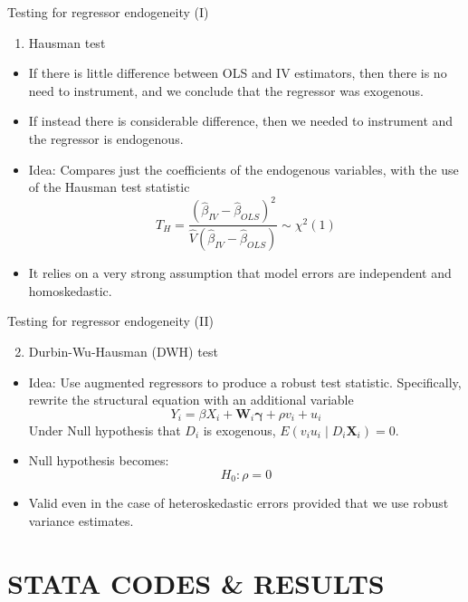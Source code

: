 \documentclass[
  10pt,
  ignorenonframetext,
]{beamer}
\providecommand{\tightlist}{%
  \setlength{\itemsep}{0pt}\setlength{\parskip}{0pt}}
\begin{document}
\begin{frame}{Testing for regressor endogeneity (I)}
\protect\hypertarget{testing-for-regressor-endogeneity-i}{}
\begin{enumerate}
\tightlist
\item
  Hausman test
\end{enumerate}

\begin{itemize}
\item
  If there is little difference between OLS and IV estimators, then
  there is no need to instrument, and we conclude that the regressor was
  exogenous.
\item
  If instead there is considerable difference, then we needed to
  instrument and the regressor is endogenous.
\item
  Idea: Compares just the coefficients of the endogenous variables, with
  the use of the Hausman test statistic \[
  T_H = \frac{(\hat\beta_{IV} - \hat\beta_{OLS})^2}{\hat V (\hat\beta_{IV} - \hat\beta_{OLS})} \sim \chi^2(1)
  \]
\item
  It relies on a very strong assumption that model errors are
  independent and homoskedastic.
\end{itemize}
\end{frame}

\begin{frame}{Testing for regressor endogeneity (II)}
\protect\hypertarget{testing-for-regressor-endogeneity-ii}{}
\begin{enumerate}
\setcounter{enumi}{1}
\tightlist
\item
  Durbin-Wu-Hausman (DWH) test
\end{enumerate}

\begin{itemize}
\item
  Idea: Use augmented regressors to produce a robust test statistic.
  Specifically, rewrite the structural equation with an additional
  variable \[
  Y_i = \beta X_i + \mathbf{W}_i\mathbf{\gamma} + \rho v_i + u_i
  \] Under Null hypothesis that \(D_i\) is exogenous,
  \(E(v_iu_i\mid D_i \mathbf{X}_i) = 0\).
\item
  Null hypothesis becomes: \[
  H_0: \rho = 0
  \]
\item
  Valid even in the case of heteroskedastic errors provided that we use
  robust variance estimates.
\end{itemize}
\end{frame}

\hypertarget{stata-codes-results}{%
\section{STATA CODES \& RESULTS}\label{stata-codes-results}}
\end{document}
